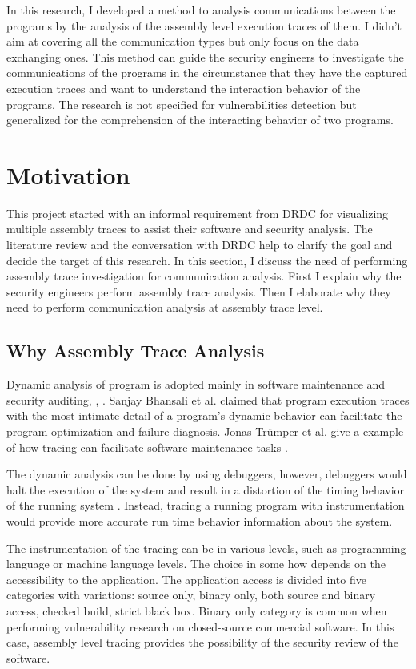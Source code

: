 In this research, I developed a method to analysis communications between the programs by the analysis of the assembly level execution traces of them. I didn't aim at covering all the communication types but only focus on the data exchanging ones. This method can guide the security engineers to investigate the communications of the programs in the circumstance that they have the captured execution traces and want to understand the interaction behavior of the programs. The research is not specified for vulnerabilities detection but generalized for the comprehension of the interacting behavior of two programs.

\section{Motivation}
This project started with an informal requirement from DRDC for visualizing multiple assembly traces to assist their software and security analysis. The literature review and the conversation with DRDC help to clarify the goal and decide the target of this research. In this section, I discuss the need of performing assembly trace investigation for communication analysis. First I explain why the security engineers perform assembly trace analysis. Then I elaborate why they need to perform communication analysis at assembly trace level. 

\subsection{Why Assembly Trace Analysis}
Dynamic analysis of program is adopted mainly in software maintenance and security auditing\cite{zhang2010detecting}, \cite{cai2016sworddta}, \cite{somorovsky2016systematic}. Sanjay Bhansali et al. claimed that program execution traces with the most intimate detail of a program's dynamic behavior can facilitate the program optimization and failure diagnosis. Jonas Tr{\"u}mper et al. give a example of how tracing can facilitate software-maintenance tasks \cite{trumper2012maintenance}.

The dynamic analysis can be done by using debuggers, however, debuggers would halt the execution of the system and result in a distortion of the timing behavior of the running system \cite{trumper2012maintenance}. Instead, tracing a running program with instrumentation would provide more accurate run time behavior information about the system.

The instrumentation of the tracing can be in various levels, such as programming language or machine language levels. The choice in some how depends on the accessibility to the application. The application access is divided into five categories with variations: source only, binary only, both source and binary access, checked build, strict black box. Binary only category is common when performing vulnerability research on closed-source commercial software.\cite{dowd_art_2006} In this case, assembly level tracing provides the possibility of the security review of the software.


